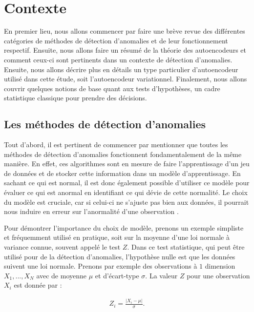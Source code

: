 \chapter{Contexte}     %
\label{chap:background}                   %

En premier lieu, nous allons commencer par faire une brève revue des différentes catégories  de méthodes de détection d'anomalies et de leur fonctionnement respectif. Ensuite, nous allons faire un résumé de la théorie des autoencodeurs et comment ceux-ci sont pertinents dans un contexte de détection d'anomalies. Ensuite, nous allons décrire plus en détails un type particulier d'autoencodeur utilisé dans cette étude, soit l'autoencodeur variationnel. Finalement, nous allons couvrir quelques notions de base quant aux tests d'hypothèses, un cadre statistique classique pour prendre des décisions.

\section{Les méthodes de détection d'anomalies}

Tout d'abord, il est pertinent de commencer par mentionner que toutes les méthodes de détection d'anomalies fonctionnent fondamentalement de la même manière. En effet, ces algorithmes sont en mesure de faire l'apprentissage d'un jeu de données et de stocker cette information dans un modèle d'apprentissage. En sachant ce qui est normal, il est donc également possible d'utiliser ce modèle pour évaluer ce qui est anormal en identifiant ce qui dévie de cette normalité. Le choix du modèle est cruciale, car si celui-ci ne s'ajuste pas bien aux données, il pourrait nous induire en erreur sur l'anormalité d'une observation \citep{10.5555/3086742}. 

Pour démontrer l'importance du choix de modèle, prenons un exemple simpliste et fréquemment utilisé en pratique, soit sur la moyenne d'une loi normale à variance connue, souvent appelé le test $Z$. Dans ce test statistique, qui peut être utilisé pour de la détection d'anomalies, l'hypothèse nulle est que les données suivent une loi normale. Prenons par exemple des observations à $1$ dimension $X_1, ..., X_N$ avec de moyenne $\mu$ et d'écart-type $\sigma$. La valeur $Z$ pour une observation $X_i$ est donnée par :

\begin{gather}
Z_i = \frac{|X_i-\mu|}{\sigma}.
\end{gather}

